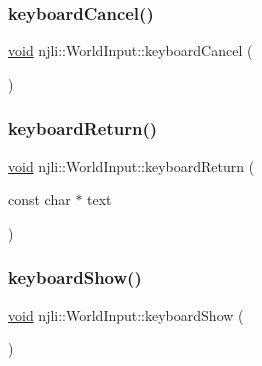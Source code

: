 \mbox{\label{classnjli_1_1_world_input_aebf5ac94a3d6c07fb30cad466c01a8c0}} 
\subsubsection{\texorpdfstring{keyboard\+Cancel()}{keyboardCancel()}}
{\footnotesize\ttfamily \mbox{\hyperlink{_thread_8h_af1e856da2e658414cb2456cb6f7ebc66}{void}} njli\+::\+World\+Input\+::keyboard\+Cancel (\begin{DoxyParamCaption}{ }\end{DoxyParamCaption})}

\mbox{\label{classnjli_1_1_world_input_a6eaa672bdd98abede6e8caa2faa0e61c}} 
\subsubsection{\texorpdfstring{keyboard\+Return()}{keyboardReturn()}}
{\footnotesize\ttfamily \mbox{\hyperlink{_thread_8h_af1e856da2e658414cb2456cb6f7ebc66}{void}} njli\+::\+World\+Input\+::keyboard\+Return (\begin{DoxyParamCaption}\item[{const char $\ast$}]{text }\end{DoxyParamCaption})}

\mbox{\label{classnjli_1_1_world_input_ab184e4e367239a869380a20df466317b}} 
\subsubsection{\texorpdfstring{keyboard\+Show()}{keyboardShow()}}
{\footnotesize\ttfamily \mbox{\hyperlink{_thread_8h_af1e856da2e658414cb2456cb6f7ebc66}{void}} njli\+::\+World\+Input\+::keyboard\+Show (\begin{DoxyParamCaption}{ }\end{DoxyParamCaption})}

